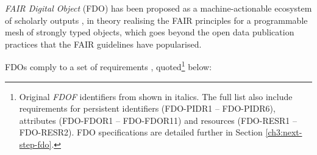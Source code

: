 \emph{FAIR Digital Object} (\acrshort{FDO}) has been proposed as a machine-actionable ecosystem of scholarly outputs \cite{Schultes 2019}, in theory realising the \acrshort{FAIR} principles 
for a programmable mesh of strongly typed objects, which goes beyond the open data publication practices that the FAIR guidelines have popularised.

FDOs comply to a set of requirements \cite{Anders 2023}, quoted\footnote{
    Original \emph{FDOF} identifiers from \cite{Bonino 2019} shown in italics.
    The full list \cite{Anders 2023} also include requirements for persistent identifiers (FDO-PIDR1 -- FDO-PIDR6), attributes (FDO-FDOR1 -- FDO-FDOR11) and resources (FDO-RESR1 -- FDO-RESR2). FDO specifications are detailed further in Section \vref{ch3:next-step-fdo}.
} below:

